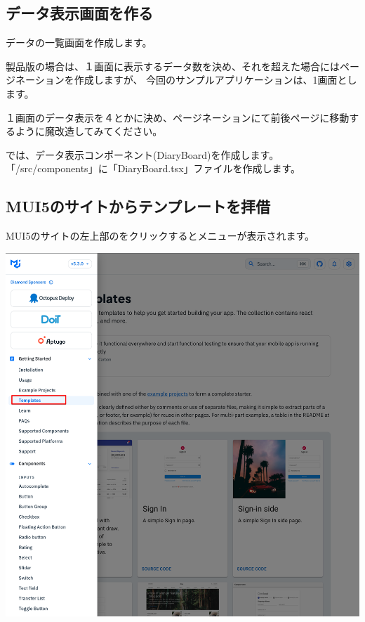 \clearpage


\subsection{データ表示画面を作る}
\keeplastskip{
  \label{sec:3-3-2}
  \label{sec-0330UI}
  \par\nobreak
}

データの一覧画面を作成します。

\vspace*{\baselineskip}

製品版の場合は、１画面に表示するデータ数を決め、それを超えた場合にはページネーションを作成しますが、
今回のサンプルアプリケーションは、1画面とします。

\vspace*{\baselineskip}

１画面のデータ表示を４とかに決め、ページネーションにて前後ページに移動するように魔改造してみてください。

\vspace*{\baselineskip}

では、データ表示コンポーネント(DiaryBoard)を作成します。
「/src/components」に「DiaryBoard.tsx」ファイルを作成します。

\subsection{MUI5のサイトからテンプレートを拝借}
\keeplastskip{
  \label{sec:3-3-3}
  \label{sec-0331}
  \par\nobreak
}

MUI5のサイトの左上部のをクリックするとメニューが表示されます。

\begin{reviewimage}[H]%
\includegraphics[width=0.5\maxwidth]{./images/03-todo-with-react/mui-siteMenu.png}%
\label{image:03-todo-with-react:mui-siteMenu}
\end{reviewimage}

